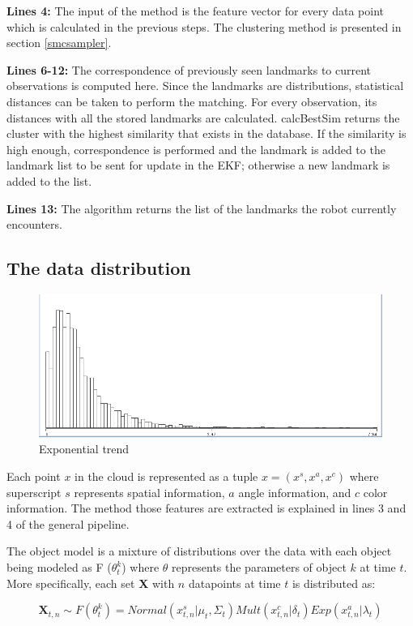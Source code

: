 \documentclass [twoside,hidelinks]{article}
\begin{document}
\textbf{Lines 4:} The input of the method is the feature vector for every data point which is calculated in the previous steps. The clustering method is presented in section \ref{smcsampler}. 

\textbf{Lines 6-12:} The correspondence of previously seen landmarks to current observations is computed here. Since the landmarks are distributions, statistical distances can be taken to perform the matching. For every observation, its distances with all the stored landmarks are calculated. calcBestSim returns the cluster with the highest similarity that exists in the database. If the similarity is high enough, correspondence is performed and the landmark is added to the landmark list to be sent for update in the EKF; otherwise a new landmark is added to the list.

\textbf{Lines 13:} The algorithm returns the list of the landmarks the robot currently encounters.

\subsection{The data distribution}
\label{data:dist}

\begin{figure}
    \centering
    \includegraphics [width=.35\textwidth]{Kullback-Leibler}
    \caption{Exponential trend}
    \label{pcl:kl}
\end{figure}

Each point $x$ in the cloud is represented as a tuple $x = (x^s, x^a, x^c ) $ where superscript $s$ represents spatial information, $a$ angle information, and $c$ color information. The method those features are extracted is explained in lines 3 and 4 of the general pipeline.

The object model is a mixture of distributions over the data with each object being modeled as F ($\theta_t^k$) where $\theta$ represents the parameters of object $k$ at time $t$. More specifically, each set \textbf{X} with $n$ datapoints at time $t$ is distributed as:

\begin{equation}
    \textbf{X}_{t,n} \sim F (\theta_t^k) = Normal (x_{t,n}^s| \mu_t, \Sigma_t) Mult (x_{t,n}^c | \delta_t) Exp (x_{t,n}^a | \lambda_t) 
\end{equation}
\end{document}
